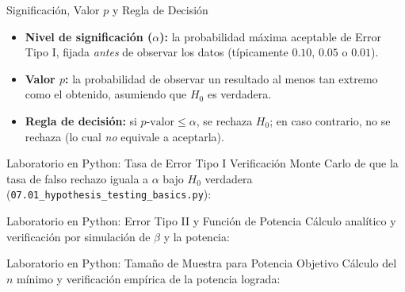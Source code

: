\documentclass[10pt, aspectratio=169]{beamer}
\begin{document}
\begin{frame}{Significación, Valor $p$ y Regla de Decisión}
  \footnotesize
  \begin{itemize}\itemsep=0.12cm
    \item \textbf{Nivel de significación ($\alpha$):} la probabilidad máxima aceptable de Error Tipo I, fijada \emph{antes} de observar los datos (típicamente $0.10$, $0.05$ o $0.01$). \pause
    \item \textbf{Valor $p$:} la probabilidad de observar un resultado al menos tan extremo como el obtenido, asumiendo que $H_0$ es verdadera. \pause
    \item \textbf{Regla de decisión:} si $p\text{-valor} \le \alpha$, se rechaza $H_0$; en caso contrario, no se rechaza (lo cual \emph{no} equivale a aceptarla).
  \end{itemize}
\end{frame}

\begin{frame}[fragile]{Laboratorio en Python: Tasa de Error Tipo I}
  \scriptsize
  Verificación Monte Carlo de que la tasa de falso rechazo iguala a $\alpha$ bajo $H_0$ verdadera (\texttt{07.01\_hypothesis\_testing\_basics.py}):
  {
  }
\end{frame}

\begin{frame}[fragile]{Laboratorio en Python: Error Tipo II y Función de Potencia}
  \scriptsize
  Cálculo analítico y verificación por simulación de $\beta$ y la potencia:
  {
  }
\end{frame}

\begin{frame}[fragile]{Laboratorio en Python: Tamaño de Muestra para Potencia Objetivo}
  \scriptsize
  Cálculo del $n$ mínimo y verificación empírica de la potencia lograda:
  {
  }
\end{frame}
\end{document}
